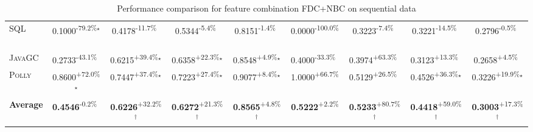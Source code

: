 \begin{table}[htbp]
\begin{tabular}{l|cccc|cccc}
\textsc{SQL} & \cellcolor{red!30}0.1000\textsuperscript{-79.2\%}$^\star$ & \cellcolor{red!30}0.4178\textsuperscript{-11.7\%}$^{\,\,\,}$ & \cellcolor{red!30}0.5344\textsuperscript{-5.4\%}$^{\,\,\,}$ & \cellcolor{red!30}0.8151\textsuperscript{-1.4\%}$^{\,\,\,}$ & \cellcolor{red!30}0.0000\textsuperscript{-100.0\%}$^{\,\,\,}$ & \cellcolor{red!30}0.3223\textsuperscript{-7.4\%}$^{\,\,\,}$ & \cellcolor{red!30}0.3221\textsuperscript{-14.5\%}$^{\,\,\,}$ & \cellcolor{red!30}0.2796\textsuperscript{-0.5\%}$^{\,\,\,}$ \\
\textsc{JavaGC} & \cellcolor{red!30}0.2733\textsuperscript{-43.1\%}$^{\,\,\,}$ & \cellcolor{green!30}0.6215\textsuperscript{+39.4\%}$^\star$ & \cellcolor{green!30}0.6358\textsuperscript{+22.3\%}$^\star$ & \cellcolor{green!30}0.8548\textsuperscript{+4.9\%}$^\star$ & \cellcolor{red!30}0.4000\textsuperscript{-33.3\%}$^{\,\,\,}$ & \cellcolor{green!30}0.3974\textsuperscript{+63.3\%}$^{\,\,\,}$ & \cellcolor{green!30}0.3123\textsuperscript{+13.3\%}$^{\,\,\,}$ & \cellcolor{green!30}0.2658\textsuperscript{+4.5\%}$^{\,\,\,}$ \\
\textsc{Polly} & \cellcolor{green!30}0.8600\textsuperscript{+72.0\%}$^\star$ & \cellcolor{green!30}0.7447\textsuperscript{+37.4\%}$^\star$ & \cellcolor{green!30}0.7223\textsuperscript{+27.4\%}$^\star$ & \cellcolor{green!30}0.9077\textsuperscript{+8.4\%}$^\star$ & \cellcolor{green!30}1.0000\textsuperscript{+66.7\%}$^{\,\,\,}$ & \cellcolor{green!30}0.5129\textsuperscript{+26.5\%}$^{\,\,\,}$ & \cellcolor{green!30}0.4526\textsuperscript{+36.3\%}$^\star$ & \cellcolor{green!30}0.3226\textsuperscript{+19.9\%}$^\star$ \\
\hline
\textbf{Average} & \cellcolor{red!30}\textbf{0.4546}\textsuperscript{-0.2\%}$^{\,\,\,}$ & \cellcolor{green!30}\textbf{0.6226}\textsuperscript{+32.2\%}$^\dagger$ & \cellcolor{green!30}\textbf{0.6272}\textsuperscript{+21.3\%}$^\dagger$ & \cellcolor{green!30}\textbf{0.8565}\textsuperscript{+4.8\%}$^\dagger$ & \cellcolor{green!30}\textbf{0.5222}\textsuperscript{+2.2\%}$^{\,\,\,}$ & \cellcolor{green!30}\textbf{0.5233}\textsuperscript{+80.7\%}$^\dagger$ & \cellcolor{green!30}\textbf{0.4418}\textsuperscript{+59.0\%}$^\dagger$ & \cellcolor{green!30}\textbf{0.3003}\textsuperscript{+17.3\%}$^\dagger$ \\
\hline
\end{tabular}
\caption{Performance comparison for feature combination FDC+NBC on sequential data}
\label{tab:combo_FDC_NBC_performance_sequential}
\end{table}